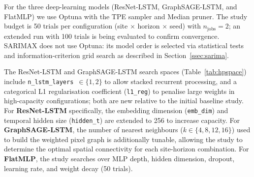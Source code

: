 For the three deep-learning models (ResNet-LSTM, GraphSAGE-LSTM, and FlatMLP)
we use Optuna \cite{akiba2019} with the TPE sampler and Median pruner.
The study budget is 50 trials per configuration
(site $\times$ horizon $\times$ seed) with $n_\text{jobs}=2$; an extended
run with 100 trials is being evaluated to confirm convergence.
SARIMAX does not use Optuna: its model order is selected via statistical tests
and information-criterion grid search as described in Section~\ref{ssec:sarima}.

The ResNet-LSTM and GraphSAGE-LSTM search spaces (Table~\ref{tab:hpspace})
include \texttt{n\_lstm\_layers}~$\in\{1,2\}$ to allow stacked recurrent
processing, and a categorical L1 regularisation coefficient
(\texttt{l1\_reg}) to penalise large weights in high-capacity configurations;
both are new relative to the initial baseline study.
For \textbf{ResNet-LSTM} specifically, the embedding dimension
(\texttt{emb\_dim}) and temporal hidden size (\texttt{hidden\_t}) are extended
to 256 to increase capacity.
For \textbf{GraphSAGE-LSTM}, the number of nearest neighbours
($k \in \{4, 8, 12, 16\}$) used to build the weighted pixel graph is
additionally tunable, allowing the study to determine the optimal spatial
connectivity for each site-horizon combination.
For \textbf{FlatMLP}, the study searches over MLP depth, hidden dimension,
dropout, learning rate, and weight decay (50 trials).

